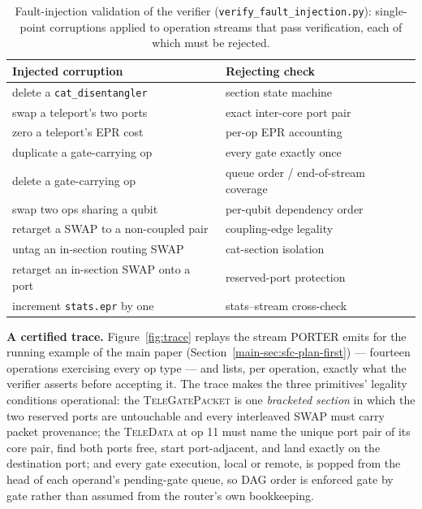 \documentclass[journal]{IEEEtran}
\newcommand{\PORTER}{\textsc{PORTER}}
\newcommand{\TeleData}{\textsc{TeleData}}
\newcommand{\TeleGatePacket}{\textsc{TeleGatePacket}}
\newcommand{\mainRunningExample}{Section~\ref{main-sec:sfc-plan-first}}
\begin{document}
\begin{table}[t]
\caption{Fault-injection validation of the verifier
  (\texttt{verify\_fault\_injection.py}): single-point corruptions
  applied to operation streams that pass verification, each of which
  must be rejected.}
\label{tab:faults}
\centering
\scriptsize
\begin{tabular}{@{}ll@{}}
\toprule
Injected corruption & Rejecting check \\
\midrule
delete a \texttt{cat\_disentangler} & section state machine \\
swap a teleport's two ports & exact inter-core port pair \\
zero a teleport's EPR cost & per-op EPR accounting \\
duplicate a gate-carrying op & every gate exactly once \\
delete a gate-carrying op & queue order / end-of-stream coverage \\
swap two ops sharing a qubit & per-qubit dependency order \\
retarget a SWAP to a non-coupled pair & coupling-edge legality \\
untag an in-section routing SWAP & cat-section isolation \\
retarget an in-section SWAP onto a port & reserved-port protection \\
increment \texttt{stats.epr} by one & stats--stream cross-check \\
\bottomrule
\end{tabular}
\end{table}

\textbf{A certified trace.} Figure~\ref{fig:trace} replays the
stream \PORTER{} emits for the running example of the main paper
(\mainRunningExample{}) --- fourteen operations exercising
every op type --- and lists, per operation, exactly what the verifier
asserts before accepting it. The
trace makes the three primitives'
legality conditions operational: the \TeleGatePacket{} is one
\emph{bracketed section} in which the two reserved ports are
untouchable and every interleaved SWAP must carry packet provenance;
the \TeleData{} at op 11 must name the unique port pair of its core
pair, find both ports free, start port-adjacent, and land exactly on
the destination port; and every gate execution, local or remote, is
popped from the head of each operand's pending-gate queue, so DAG
order is enforced gate by gate rather than assumed from the router's
own bookkeeping.
\end{document}
